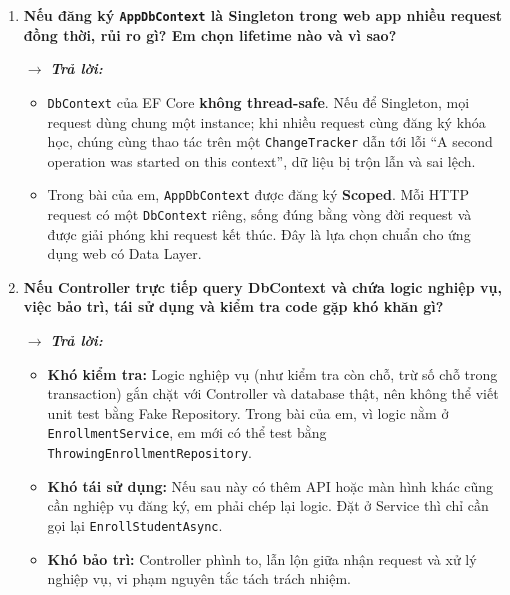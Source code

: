 \begin{enumerate}[label = \arabic*.]
    \item \textbf{Nếu đăng ký \texttt{AppDbContext} là Singleton trong web app nhiều request đồng thời, rủi ro gì? Em chọn lifetime nào và vì sao?}

    $\rightarrow$ \textbf{\textit{Trả lời:}}
    \begin{itemize}[leftmargin = 0.6cm, label = -]
        \item \texttt{DbContext} của EF Core \textbf{không thread-safe}. Nếu để Singleton, mọi request dùng chung một instance; khi nhiều request cùng đăng ký khóa học, chúng cùng thao tác trên một \texttt{ChangeTracker} dẫn tới lỗi ``A second operation was started on this context'', dữ liệu bị trộn lẫn và sai lệch.

        \item Trong bài của em, \texttt{AppDbContext} được đăng ký \textbf{Scoped}. Mỗi HTTP request có một \texttt{DbContext} riêng, sống đúng bằng vòng đời request và được giải phóng khi request kết thúc. Đây là lựa chọn chuẩn cho ứng dụng web có Data Layer.
    \end{itemize}

    \item \textbf{Nếu Controller trực tiếp query DbContext và chứa logic nghiệp vụ, việc bảo trì, tái sử dụng và kiểm tra code gặp khó khăn gì?}

    $\rightarrow$ \textbf{\textit{Trả lời:}}
    \begin{itemize}[leftmargin = 0.6cm, label = -]
        \item \textbf{Khó kiểm tra:} Logic nghiệp vụ (như kiểm tra còn chỗ, trừ số chỗ trong transaction) gắn chặt với Controller và database thật, nên không thể viết unit test bằng Fake Repository. Trong bài của em, vì logic nằm ở \texttt{EnrollmentService}, em mới có thể test bằng \\ \texttt{ThrowingEnrollmentRepository}.

        \item \textbf{Khó tái sử dụng:} Nếu sau này có thêm API hoặc màn hình khác cũng cần nghiệp vụ đăng ký, em phải chép lại logic. Đặt ở Service thì chỉ cần gọi lại \texttt{EnrollStudentAsync}.

        \item \textbf{Khó bảo trì:} Controller phình to, lẫn lộn giữa nhận request và xử lý nghiệp vụ, vi phạm nguyên tắc tách trách nhiệm.
    \end{itemize}


\end{enumerate}
